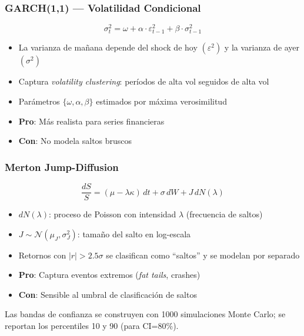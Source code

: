 \documentclass[11pt, a4paper]{article}
\begin{document}
\subsubsection{GARCH(1,1) — Volatilidad Condicional}

\begin{formulabox}[{GARCH(1,1)}]
  \[ \sigma_t^2 = \omega + \alpha \cdot \varepsilon_{t-1}^2 + \beta \cdot \sigma_{t-1}^2 \]
  \begin{itemize}
    \item La varianza de mañana depende del shock de hoy $(\varepsilon^2)$ y la varianza de ayer $(\sigma^2)$
    \item Captura \textit{volatility clustering}: períodos de alta vol seguidos de alta vol
    \item Parámetros $\{\omega, \alpha, \beta\}$ estimados por máxima verosimilitud
    \item \textbf{Pro}: Más realista para series financieras
    \item \textbf{Con}: No modela saltos bruscos
  \end{itemize}
\end{formulabox}

\subsubsection{Merton Jump-Diffusion}

\begin{formulabox}
  \[ \frac{dS}{S} = (\mu - \lambda\kappa)\,dt + \sigma\,dW + J\,dN(\lambda) \]
  \begin{itemize}
    \item $dN(\lambda)$: proceso de Poisson con intensidad $\lambda$ (frecuencia de saltos)
    \item $J \sim \mathcal{N}(\mu_J, \sigma_J^2)$: tamaño del salto en log-escala
    \item Retornos con $|r| > 2.5\sigma$ se clasifican como ``saltos'' y se modelan por separado
    \item \textbf{Pro}: Captura eventos extremos (\textit{fat tails}, crashes)
    \item \textbf{Con}: Sensible al umbral de clasificación de saltos
  \end{itemize}
\end{formulabox}

Las bandas de confianza se construyen con 1000 simulaciones Monte Carlo; se reportan los percentiles 10 y 90 (para CI=80\%).
\end{document}
